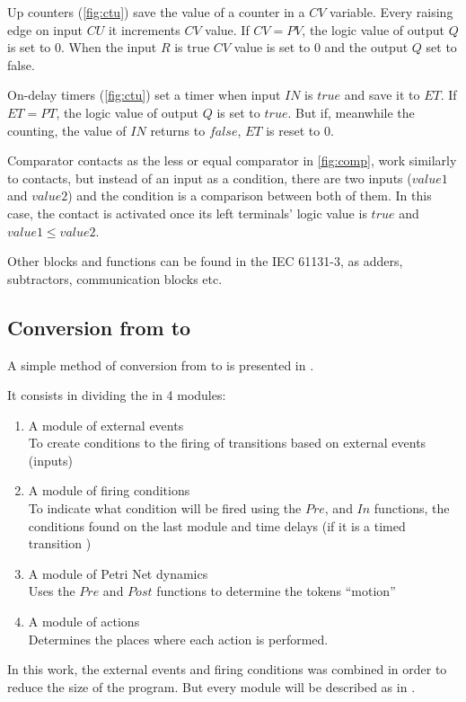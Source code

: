 Up counters (\autoref{fig:ctu}) save the value of a counter in a $CV$ variable. Every raising edge
on input $CU$ it increments $CV$ value. If $CV=PV$, the logic value of output $Q$ 
is set to $0$. When the input $R$ is true $CV$ value is set to $0$ and the
output $Q$ set to false.

On-delay timers (\autoref{fig:ctu}) set a timer when input $IN$ is $true$
and save it to $ET$. If $ET=PT$, the logic value of output $Q$ is set to $true$.
But if, meanwhile the counting, the value of $IN$ returns to $false$, $ET$ is reset to
$0$.

Comparator contacts as the less or equal comparator in \autoref{fig:comp}, work
similarly to contacts, but instead of an input as a condition, there are two
inputs ($value1$ and $value2$) and the condition is a comparison between both of
them. In this case, the contact is activated once its left terminals' logic
value is $true$ and $value1\leq value2$.

Other blocks and functions can be found in the IEC 61131-3, as adders,
subtractors, communication blocks etc.

\subsection{Conversion from \CIPN{} to \LD}
\label{sec:cipnToLD}

A simple method of conversion from \CIPN{} to \LD is presented in
\cite{moreira2013bridging}.

It consists in dividing the \CIPN{} in 4 modules:
\begin{enumerate}
\item A module of external events\\
  To create conditions to the firing of transitions based on external events
  (inputs)
\item A module of firing conditions\\
  To indicate what condition will be fired using the $Pre$, and $In$ functions, the conditions found on the
  last module and time delays (if it is a timed transition 
  )
\item A module of Petri Net dynamics\\
Uses the $Pre$ and $Post$ functions to determine the tokens ``motion''
\item A module of actions\\
  Determines the places where each action is performed.
\end{enumerate}
In this work, the external events and firing conditions was combined in order to
reduce the size of the program. But every module will be described as in
\cite{moreira2013bridging}.

